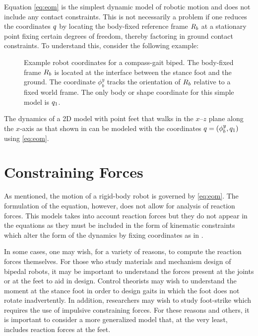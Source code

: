 Equation \eqref{eq:eom} is the simplest dynamic model of robotic motion and does
not include any contact constraints.
% 
This is not necessarily a problem if one reduces the coordinates $q$ by locating
the body-fixed reference frame $R_{b}$ at a stationary point fixing certain
degrees of freedom, thereby factoring in ground contact constraints.
%
To understand this, consider the following example:

\begin{figure}[t!]
  \centering
  \def\svgwidth{.5\columnwidth}
  
  \caption[Example robot coordinates for a compass-gait biped.]{Example robot
    coordinates for a compass-gait biped.
    The body-fixed frame $R_{b}$ is located at the interface between the stance
    foot and the ground.
    The coordinate $\phi_{b}^{y}$ tracks the orientation of $R_{b}$ relative to
    a fixed world frame.
    The only body or shape coordinate for this simple model is $q_{1}$.}
    \label{fig:compass_gait_reduced_coordinates}
\end{figure}

\begin{exmp}
  \label{ex:compass_gait_reduced_coordinates}
  The dynamics of a 2D model with point feet that walks in the
  $x$--$z$ plane along the $x$-axis as that shown in
   can be modeled with the
  coordinates $q = (\phi_{b}^{y}, q_{1})$ using \eqref{eq:eom}.
\end{exmp}


\section{Constraining Forces}

As mentioned, the motion of a rigid-body robot is governed by \eqref{eq:eom}.
%
The formulation of the equation, however, does not allow for analysis of
reaction forces.
%
This models takes into account reaction forces but they do not appear in the
equations as they must be included in the form of kinematic constraints which
alter the form of the dynamics by fixing coordinates as in .

In some cases, one may wish, for a variety of reasons, to compute the reaction
forces themselves.
%
For those who study materials and mechanism design of bipedal robots, it may be
important to understand the forces present at the joints or at the feet to aid
in design.
%
Control theorists may wish to understand the moment at the stance foot in order
to design gaits in which the foot does not rotate inadvertently.
%
In addition, researchers may wish to study foot-strike which requires the use of
impulsive constraining forces.
%
For these reasons and others, it is important to consider a more generalized
model that, at the very least, includes reaction forces at the feet.

